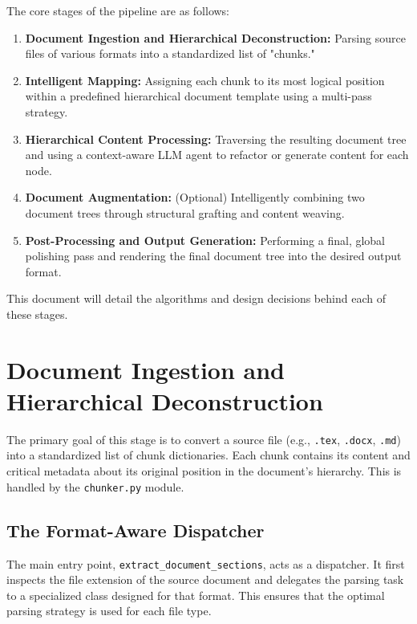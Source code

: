 \documentclass{article}
\begin{document}
The core stages of the pipeline are as follows:
\begin{enumerate}
    \item \textbf{Document Ingestion and Hierarchical Deconstruction:} Parsing source files of various formats into a standardized list of "chunks."
    \item \textbf{Intelligent Mapping:} Assigning each chunk to its most logical position within a predefined hierarchical document template using a multi-pass strategy.
    \item \textbf{Hierarchical Content Processing:} Traversing the resulting document tree and using a context-aware LLM agent to refactor or generate content for each node.
    \item \textbf{Document Augmentation:} (Optional) Intelligently combining two document trees through structural grafting and content weaving.
    \item \textbf{Post-Processing and Output Generation:} Performing a final, global polishing pass and rendering the final document tree into the desired output format.
\end{enumerate}

This document will detail the algorithms and design decisions behind each of these stages.

\section{Document Ingestion and Hierarchical Deconstruction}
The primary goal of this stage is to convert a source file (e.g., \texttt{.tex}, \texttt{.docx}, \texttt{.md}) into a standardized list of chunk dictionaries. Each chunk contains its content and critical metadata about its original position in the document's hierarchy. This is handled by the \texttt{chunker.py} module.

\subsection{The Format-Aware Dispatcher}
The main entry point, \texttt{extract\_document\_sections}, acts as a dispatcher. It first inspects the file extension of the source document and delegates the parsing task to a specialized class designed for that format. This ensures that the optimal parsing strategy is used for each file type.
\end{document}
